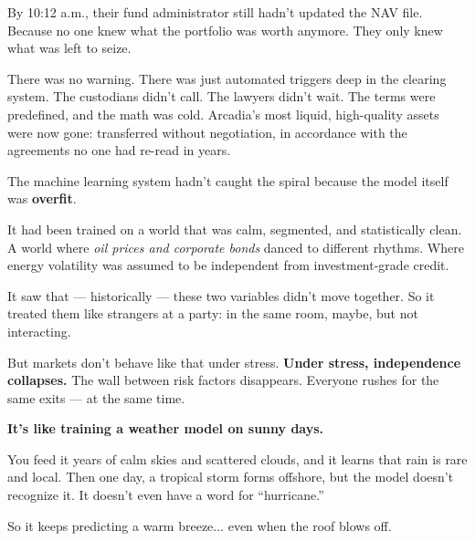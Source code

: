\medskip

By 10:12 a.m., their fund administrator still hadn’t updated the NAV file.  
Because no one knew what the portfolio was worth anymore.  
They only knew what was left to seize.

There was no warning. There was just automated triggers deep in the clearing system. The custodians didn’t call. 
The lawyers didn’t wait. The terms were predefined, and the math was cold. Arcadia's most liquid, high-quality 
assets were now gone: transferred without negotiation, in accordance with the agreements no one had re-read in years.

The machine learning system hadn’t caught the spiral because the model itself was \textbf{overfit}.

It had been trained on a world that was calm, segmented, and statistically clean. A world where \textit{oil 
prices and corporate bonds} danced to different rhythms. Where energy volatility was assumed to be independent 
from investment-grade credit.

It saw that — historically — these two variables didn’t move together. So it treated them like strangers at a 
party: in the same room, maybe, but not interacting.

But markets don’t behave like that under stress. \textbf{Under stress, independence collapses.} The wall 
between risk factors disappears. Everyone rushes for the same exits — at the same time.

\textbf{It’s like training a weather model on sunny days.}

You feed it years of calm skies and scattered clouds, and it learns that rain is rare and local. Then one 
day, a tropical storm forms offshore, but the model doesn’t recognize it. It doesn’t even have a word for 
``hurricane.''

So it keeps predicting a warm breeze... even when the roof blows off.

\medskip

